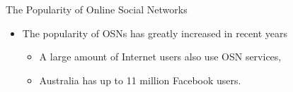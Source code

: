\documentclass[
 size=14pt,
 paper=smartboard,  %
 mode=present, 		%
 display=slides, 	%
 style=tuliplab,  	%
 pauseslide,
 fleqn,leqno]{powerdot}
\begin{document}
\begin{slide}[toc=,bm=]{The Popularity of Online Social Networks}

\begin{itemize}
\item
The popularity of OSNs has greatly increased in recent years

\begin{itemize}
\item
A large amount of Internet users also use OSN services,

\item
Australia has up to 11 million Facebook users.
\end{itemize}

\end{itemize}

\begin{figure}[htbp]
    \centering
\end{figure}

\end{slide}
\end{document}

